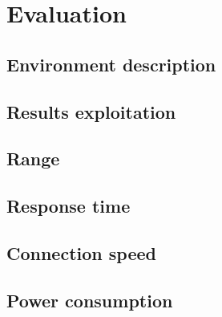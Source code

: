 \section{Evaluation}

\subsection{Environment description}

\subsection{Results exploitation}

\subsection{Range}

\subsection{Response time}

\subsection{Connection speed}

\subsection{Power consumption}
